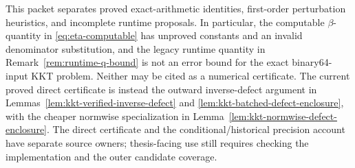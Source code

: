 %
%
%
%

\begin{remark}\label{rem:qp-precision-status}
This packet separates proved exact-arithmetic identities,
first-order perturbation heuristics, and incomplete runtime proposals.  In
particular, the computable \(\beta\)-quantity in
\eqref{eq:eta-computable} has unproved constants and an invalid denominator
substitution, and the legacy runtime quantity in
Remark~\ref{rem:runtime-q-bound} is not an error bound for the exact
binary64-input KKT problem.  Neither may be cited as a numerical certificate.
The current proved direct certificate is instead the outward inverse-defect
argument in Lemmas~\ref{lem:kkt-verified-inverse-defect} and
\ref{lem:kkt-batched-defect-enclosure}, with the cheaper normwise
specialization in Lemma~\ref{lem:kkt-normwise-defect-enclosure}.  The direct certificate and the conditional/historical precision account
have separate source owners; thesis-facing use still requires checking the
implementation and the outer candidate coverage.
\end{remark}




